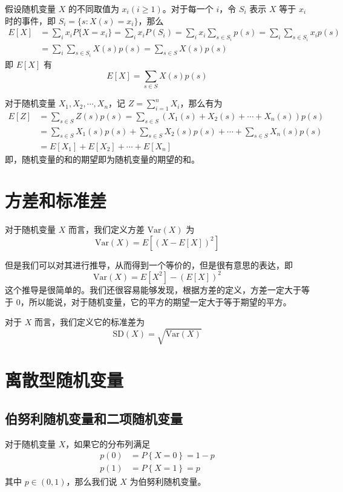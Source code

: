 \documentclass[utf8,a4paper,nofonts,9pt]{ctexbook}
\begin{document}
假设随机变量 $X$ 的不同取值为 $x_i ( i \ge 1 )$。对于每一个 $i$，令 $S_i$ 表示 $X$ 等于 $x_i$ 时的事件，即 $S_i = \{ s: X(s) = x_i \}$，那么
\begin{align*}
    E[X] & = \sum_{i} x_i P\{ X = x_i \} = \sum_{i} x_i P(S_i) = \sum_{i} x_i \sum_{s \in S_i} p(s) = \sum_{i} \sum_{s \in S_i} x_i p(s) \\
         & = \sum_i \sum_{s \in S_i} X(s) p(s) = \sum_{s \in S} X(s) p(s)
\end{align*}
即 $E[X]$ 有
\[
    E[X] = \sum_{s \in S} X(s) p(s)
\]

对于随机变量 $X_1, X_2, \cdots, X_n$，记 $Z = \sum_{i = 1}^n X_i$，那么有为
\begin{align*}
    E[Z] & = \sum_{s \in S} Z(s) p(s) = \sum_{s \in S} \left( X_1(s) + X_2(s) + \cdots + X_n(s) \right) p(s) \\
         & = \sum_{s \in S} X_1(s) p(s) + \sum_{s \in S} X_2(s) p(s) + \cdots + \sum_{s \in S} X_n(s) p(s) \\
         & = E[X_1] + E[X_2] + \cdots + E[X_n]
\end{align*}
即，随机变量的和的期望即为随机变量的期望的和。



\section{方差和标准差}

对于随机变量 $X$ 而言，我们定义方差 $\textrm{Var}(X)$ 为
\[
    \textrm{Var}(X) = E\left[ (X - E[X])^2 \right]
\]

但是我们可以对其进行推导，从而得到一个等价的，但是很有意思的表达，即
\[
    \textrm{Var}(X) = E[X^2] - (E[X])^2
\]
这个推导是很简单的。我们还很容易能够发现，根据方差的定义，方差一定大于等于 $0$，所以能说，对于随机变量，它的平方的期望一定大于等于期望的平方。

对于 $X$ 而言，我们定义它的标准差为
\[
    \textrm{SD}(X) = \sqrt{\textrm{Var}(X)}
\]



\section{离散型随机变量}


\subsection{伯努利随机变量和二项随机变量}

对于随机变量 $X$，如果它的分布列满足
\begin{align*}
    p(0) & = P\left\{ X = 0 \right\} = 1 - p \\
    p(1) & = P\left\{ X = 1 \right\} = p
\end{align*}
其中 $p \in (0, 1)$，那么我们说 $X$ 为伯努利随机变量。
\end{document}
